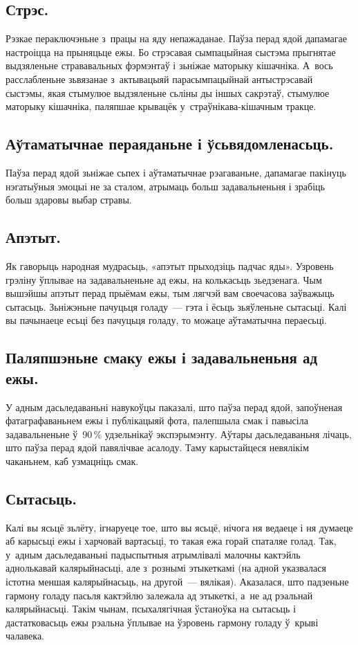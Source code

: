 \subsection{Стрэс.}
Рэзкае пераключэньне з~працы на яду непажаданае. Паўза перад ядой дапамагае настроіцца на прыняцьце ежы. Бо стрэсавая сымпацыйная сыстэма прыгнятае выдзяленьне стрававальных фэрмэнтаў і зьніжае маторыку кішачніка. А~вось расслабленьне зьвязанае з~актывацыяй парасымпацыйнай антыстрэсавай сыстэмы, якая стымулюе выдзяленьне сьліны ды іншых сакрэтаў, стымулюе маторыку кішачніка, паляпшае крывацёк у~страўнікава-кішачным тракце.

\subsection{Аўтаматычнае пераяданьне і ўсьвядомленасьць.}
Паўза перад ядой зьніжае сьпех і аўтаматычнае рэагаваньне, дапамагае пакінуць нэгатыўныя эмоцыі не за сталом, атрымаць больш задавальненьня і зрабіць больш здаровы выбар стравы.


\subsection{Апэтыт.}
Як гаворыць народная мудрасьць, «апэтыт прыходзіць падчас яды». Узровень грэліну ўплывае на задавальненьне ад ежы, на колькасьць зьедзенага. Чым вышэйшы апэтыт перад прыёмам ежы, тым лягчэй вам своечасова заўважыць сытасьць. Зьніжэньне пачуцьця голаду~--- гэта і ёсьць зьяўленьне сытасьці. Калі вы пачынаеце есьці без пачуцьця голаду, то можаце аўтаматычна пераесьці.

\subsection{Паляпшэньне смаку ежы і задавальненьня ад ежы.}
У адным дасьледаваньні навукоўцы паказалі, што паўза перад ядой, запоўненая фатаграфаваньнем ежы і публікацыяй фота, палепшыла смак і павысіла задавальненьне ў~90\,\% удзельнікаў экспэрымэнту. Аўтары дасьледаваньня лічаць, што паўза перад ядой павялічвае асалоду. Таму карыстайцеся невялікім чаканьнем, каб узмацніць смак.

\subsection{Сытасьць.}
Калі вы ясьцё зьлёту, ігнаруеце тое, што вы ясьцё, нічога ня ведаеце і ня думаеце аб карысьці ежы і харчовай вартасьці, то такая ежа горай спаталяе голад. Так, у~адным дасьледаваньні падыспытныя атрымлівалі малочны кактэйль аднолькавай калярыйнасьці, але з~рознымі этыкеткамі (на адной указвалася істотна меншая калярыйнасьць, на другой~--- вялікая). Аказалася, што падзеньне гармону голаду пасьля кактэйлю залежала ад этыкеткі, а~не ад рэальнай калярыйнасьці. Такім чынам, псыхалягічная ўстаноўка на сытасьць і дастатковасьць ежы рэальна ўплывае на ўзровень гармону голаду ў~крыві чалавека.

